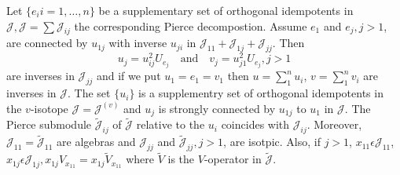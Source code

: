 \begin{lemma}\label{c2:sec3:lem2}
Let $\{e_i i=1,\ldots,n\}$ be a supplementary set of orthogonal
idempotents in $\mathscr{J}, \mathscr{J}=\sum \mathscr{J}_{ij}$ the
corresponding Pierce decompostion. Assume $e_1$ and $e_j,j>1$, are
connected by $u_{1j}$ with inverse $u_{ji}$ in
$\mathscr{J}_{11}+\mathscr{J}_{1j}+\mathscr{J}_{jj}$. Then
\begin{equation*}
  u_j=u^{2}_{ij}U_{e_{j}}\quad\text{and}\quad
  v_j=u^{2}_{j1}U_{e_{j}},j>1\tag{36}\label{c2:eq36} 
\end{equation*}\pageoriginale
are inverses in $\mathscr{J}_{jj}$ and if we put $u_1=e_1=v_1$ then
$u=\sum\limits_{1}^{n}u_i$, $v=\sum\limits_{1}^{n}v_i$ are inverses in
$\mathscr{J}$. The set $\{u_i\}$ is a supplementry set of orthogonal
idempotents in the $v$-isotope $\mathscr{J}=\mathscr{J}^{(v)}$ and
$u_j$ is strongly connected by $u_{1j}$ to $u_1$ in $\mathscr{J}$. The
Pierce submodule $\widetilde{\mathscr{J}}_{ij}$ of
$\widetilde{\mathscr{J}}$ relative to the $u_i$ coincides with
$\mathscr{J}_{ij}$. Moreover,
$\mathscr{J}_{11}=\widetilde{\mathscr{J}}_{11}$ are algebras and
$\mathscr{J}_{jj}$ and $\widetilde{\mathscr{J}}_{jj},j>1$, are
isotpic. Also, if $j>1$,  $x_{11}\epsilon \mathscr{J}_{11}$,
$x_{1j}\epsilon
\mathscr{J}_{1j},x_{1j}V_{x_{11}}=x_{1j}\widetilde{V}_{x_{11}}$ where
$\widetilde{V}$ is the  $V$-operator in $\widetilde{\mathscr{J}}$. 
\end{lemma}

